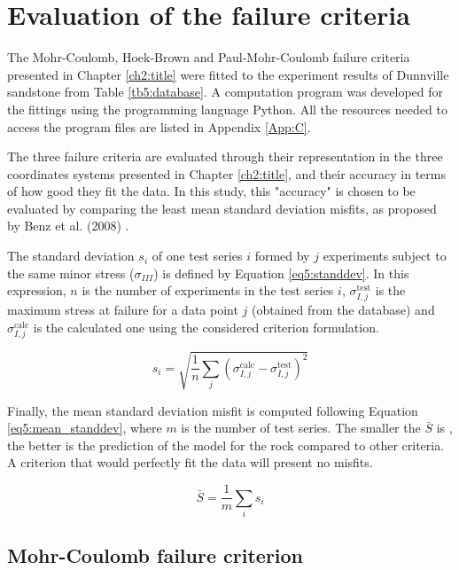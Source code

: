 \section{Evaluation of the failure criteria}\label{ch5:evaluation}

The Mohr-Coulomb, Hoek-Brown and Paul-Mohr-Coulomb failure criteria presented in Chapter \ref{ch2:title} were fitted to the experiment results of Dunnville sandstone from Table \ref{tb5:database}. A computation program was developed for the fittings using the programming language Python. All the resources needed to access the program files are listed in Appendix \ref{App:C}. 

The three failure criteria are evaluated through their representation in the three coordinates systems presented in Chapter \ref{ch2:title}, and their accuracy in terms of how good they fit the data. In this study, this "accuracy" is chosen to be evaluated by comparing the least mean standard deviation misfits, as proposed by Benz et al. (2008) \cite{Benz2008}. 

The standard deviation $s_{i}$ of one test series $i$ formed by $j$ experiments subject to the same minor stress ($\sigma_{III}$) is defined by Equation \ref{eq5:standdev}. In this expression, $n$ is the number of experiments in the test series $i$, $\sigma_{I,j}^{\mathrm{test}}$ is the maximum stress at failure for a data point $j$ (obtained from the database) and $\sigma_{I,j}^{\mathrm{calc}}$ is the calculated one using the considered criterion formulation. 

\begin{equation}\label{eq5:standdev}
    s_{i}=\sqrt{\frac{1}{n} \sum_{j}\left(\sigma_{I,j}^{\mathrm{calc}}-\sigma_{I,j}^{\mathrm{test}}\right)^{2}}
\end{equation}

Finally, the mean standard deviation misfit is computed following Equation \ref{eq5:mean_standdev}, where $m$ is the number of test series. The smaller the $\bar{S}$ is , the better is the prediction of the model for the rock compared to other criteria. A criterion that would perfectly fit the data will present no misfits. 

\begin{equation}\label{eq5:mean_standdev}
    \bar{S}=\frac{1}{m} \sum_{i} s_{i}
\end{equation}


\subsection{Mohr-Coulomb failure criterion}

